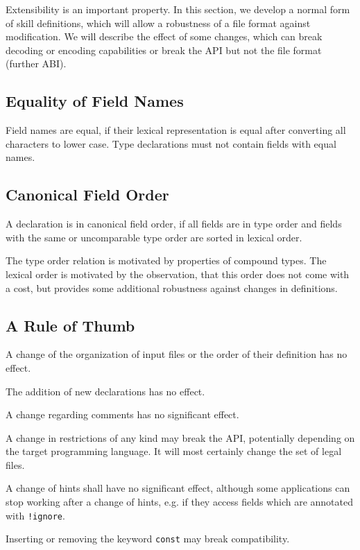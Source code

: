 \documentclass[a4paper,10pt]{article}
\begin{document}
Extensibility is an important property. In this section, we develop a normal form of skill definitions, which will allow a robustness of a file format against modification. We will describe the effect of some changes, which can break decoding or encoding capabilities or break the API but not the file format (further ABI).

\subsection{Equality of Field Names}

Field names are equal, if their lexical representation is equal after converting all characters to lower case. Type declarations must not contain fields with equal names.

\subsection{Canonical Field Order}

A declaration is in canonical field order, if all fields are in type order and fields with the same or uncomparable type order are sorted in lexical order.

The type order relation is motivated by properties of compound types. The lexical order is motivated by the observation, that this order does not come with a cost, but provides some additional robustness against changes in definitions.

\subsection{A Rule of Thumb}

A change of the organization of input files or the order of their definition has no effect.

The addition of new declarations has no effect.

A change regarding comments has no significant effect.

A change in restrictions of any kind may break the API, potentially depending on the target programming language. It will most certainly change the set of legal files.

A change of hints shall have no significant effect, although some applications can stop working after a change of hints, e.g. if they access fields which are annotated with \verb/!ignore/.

Inserting or removing the keyword \texttt{const} may break compatibility.
\end{document}
